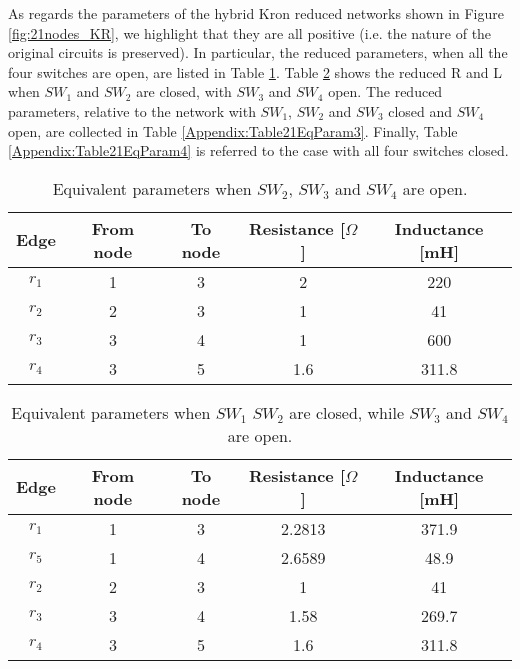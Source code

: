 \documentclass[a4paper]{article}
\theoremstyle{plain}
\begin{document}
	As regards the parameters of the hybrid Kron reduced networks
        shown in Figure \ref{fig:21nodes_KR}, we highlight that they
        are all positive (i.e. the nature of the original circuits is
        preserved). In particular, the reduced parameters, when all the four switches are open, are listed in Table \ref{Appendix:Table21EqParam1}. Table \ref{Appendix:Table21EqParam2} shows the reduced R and L when $SW_1$ and $SW_2$ are closed, with $SW_3$ and $SW_4$ open. The reduced parameters, relative to the network with $SW_1$, $SW_2$ and $SW_3$ closed and $SW_4$ open, are collected in Table \ref{Appendix:Table21EqParam3}. Finally, Table \ref{Appendix:Table21EqParam4} is referred to the case with all four switches closed.
		\begin{table}[!h]
			\centering
			\begin{tabular}{ccccc}
				\toprule
				Edge & From node & To node & Resistance [$\Omega$] & Inductance [mH] \\
				\midrule
				$r_1$ & 1 & 3 & 2 & 220\\
				$r_2$ & 2 & 3 & 1 & 41\\
				$r_3$ & 3 & 4 & 1 &  600 \\
				$r_4$ & 3 & 5 & 1.6 & 311.8 \\
				\bottomrule
			\end{tabular}
			\caption{Equivalent parameters when $SW_2$, $SW_3$ and $SW_4$ are open.}
			\label{Appendix:Table21EqParam1}
		\end{table}
		
		\begin{table}[!h]
			\centering
			\begin{tabular}{ccccc}
				\toprule
				Edge & From node & To node & Resistance [$\Omega$] & Inductance [mH] \\
				\midrule
				$r_1$ & 1 & 3 & 2.2813 & 371.9\\
				$r_5$ & 1 & 4 & 2.6589 & 48.9\\
				$r_2$ & 2 & 3 & 1 & 41\\
				$r_3$ & 3 & 4 & 1.58 &  269.7 \\
				$r_4$ & 3 & 5 & 1.6 & 311.8 \\
				\bottomrule
			\end{tabular}
			\caption{Equivalent parameters when $SW_1$ $SW_2$ are closed, while $SW_3$ and $SW_4$ are open.}
			\label{Appendix:Table21EqParam2}
		\end{table}
		
\end{document}
